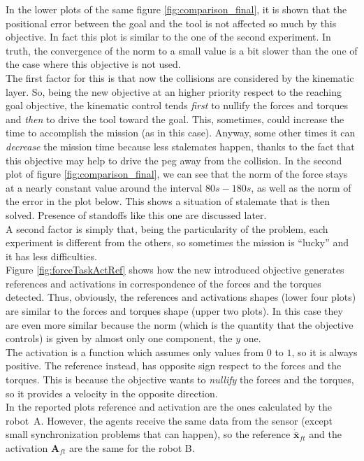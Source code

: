 In the lower plots of the same figure \ref{fig:comparison_final}, it is shown that the positional error between the goal and the tool is not affected so much by this objective. In fact this plot is similar to the one of the second experiment. In truth, the convergence of the norm to a small value is a bit slower than the one of the case where this objective is not used.\\
The first factor for this is that now the collisions are considered by the kinematic layer. So, being the new objective at an higher priority respect to the reaching goal objective, the kinematic control tends \textit{first} to nullify the forces and torques and \textit{then} to drive the tool toward the goal. This, sometimes, could increase the time to accomplish the mission (as in this case). Anyway, some other times it can \textit{decrease} the mission time because less stalemates happen, thanks to the fact that this objective may help to drive the peg away from the collision. In the second plot of figure \ref{fig:comparison_final}, we can see that the norm of the force stays at a nearly constant value around the interval $80s-180s$, as well as the norm of the error in the plot below. This shows a situation of stalemate that is then solved. Presence of standoffs like this one are discussed later.\\
A second factor is simply that, being the particularity of the problem, each experiment is different from the others, so sometimes the mission is \enquote{lucky} and it has less difficulties.\\

Figure \ref{fig:forceTaskActRef} shows how the new introduced objective generates references and activations in correspondence of the forces and the torques detected. Thus, obviously, the references and activations shapes (lower four plots) are similar to the forces and torques shape (upper two plots). In this case they are even more similar because the norm (which is the quantity that the objective controls) is given by almost only one component, the $y$ one.\\ 
The activation is a function which assumes only values from $0$ to $1$, so it is always positive. The reference instead, has opposite sign respect to the forces and the torques. This is because the objective wants to \textit{nullify} the forces and the torques, so it provides a velocity in the opposite direction.\\ 
In the reported plots reference and activation are the ones calculated by the \mbox{robot A}. However, the agents receive the same data from the sensor (except small synchronization problems that can happen), so the reference $\dot{\bar{\boldsymbol{x}}}_{ft}$ and the activation 	$\boldsymbol{A}_{ft}$ are the same for the robot B.\\

